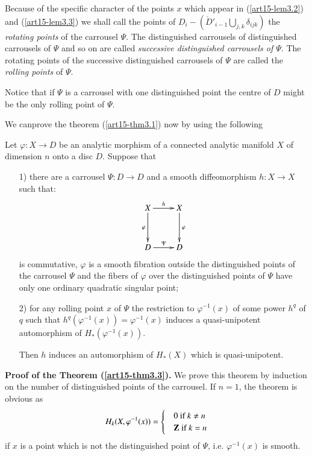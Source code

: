 Because of the specific character of the points $x$ which appear in (\ref{art15-lem3.2}) and (\ref{art15-lem3.3}) we shall call the points of $D_i - (\mathring{D}'_{i-1} \bigcup\limits_{j,k} \delta_{ijk})$ the {\em rotating points} of the carrousel $\Psi$. The distinguished carrousels of distinguished carrousels of $\Psi$ and so on are called {\em successive distinguished carrousels of $\Psi$}. The rotating points of the successive distinguished carrousels of $\Psi$ are called the {\em rolling points} of $\Psi$.


Notice that if $\Psi$ is a carrousel with one distinguished point the centre of $D$ might be the only rolling point of $\Psi$.

We can\pageoriginale prove the theorem (\ref{art15-thm3.1}) now by using the following 

\setcounter{lemma}{2}
\begin{thm}\label{art15-thm3.3}
Let $\varphi: X \to D$ be an analytic morphism of a connected analytic manifold $X$ of dimension $n$ onto a disc $D$. Suppose that 
\begin{itemize}
\item[1)] there are a carrousel $\Psi: D \to D$ and a smooth diffeomorphism $h:X \to X$ such that:
\[
\xymatrix@R=1.2cm{
X \ar[r]^h \ar[d]_\varphi & X \ar[d]^{\varphi}\\
D \ar[r]^{\Psi} & D
}
\]
is commutative, $\varphi$ is a smooth fibration outside the distinguished points of the carrousel $\Psi$ and the fibers of $\varphi$ over the distinguished points of $\Psi$ have only one ordinary quadratic singular point;

\item[2)] for any rolling point $x$ of $\Psi$ the restriction to $\varphi^{-1} (x)$ of some power $h^q$ of $q$ such that $h^q (\varphi^{-1} (x)) =\varphi^{-1} (x)$ induces a quasi-unipotent automorphism of $H_* (\varphi^{-1}(x))$.

Then $h$ induces an automorphism of $H_* (X)$ which is quasi-unipotent. 
\end{itemize}
\end{thm}

\noindent
{\bf Proof of the Theorem (\ref{art15-thm3.3}).} We prove this theorem by induction on the number of distinguished points of the carrousel. If $n =1$, the theorem is obvious as
\begin{equation*}
H_k (X, \varphi^{-1} (x)) =
\begin{cases}
& 0  \text{ if } k \neq n \\
& \mathbf{Z} \text{ if } k = n
\end{cases}
\end{equation*}
if $x$ is a point which is not the distinguished point of $\Psi$, i.e. $\varphi^{-1} (x)$ is smooth.

